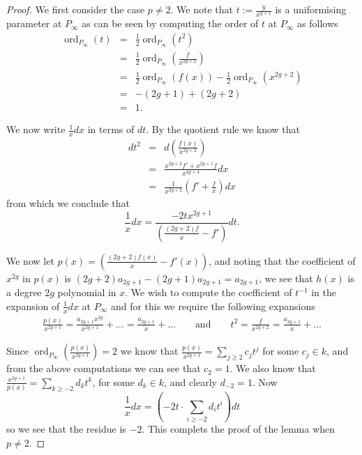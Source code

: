 \documentclass[draft, 11pt]{article} %
\theoremstyle{plain}
\theoremstyle{remark}
\DeclareMathOperator{\ord}{ord}
\begin{document}
\begin{proof}

We first consider the case $p\neq 2$.
We note that $t:= \frac{y}{x^{g+1}}$ is a uniformising parameter at $P_\infty$ as can be seen by computing the order of $t$ at $P_\infty$ as follows
\begin{eqnarray}
\ord_{P_\infty}(t) & = & \frac{1}{2}\ord_{P_\infty}(t^2) \\
  & = & \frac{1}{2}\ord_{P_\infty}\left( \frac{f}{x^{2g+2}} \right) \\
& = & \frac{1}{2}\ord_{P_\infty}(f(x)) - \frac{1}{2}\ord_{P_\infty}(x^{2g+2})\\
& = & -(2g+1) + (2g+2) \\
& = & 1.
\end{eqnarray}

We now write $\frac{1}{x}dx$ in terms of $dt$.
By the quotient rule we know that
\begin{eqnarray*}
dt^2 & = & d \left( \frac{f(x)}{x^{2g+2}} \right) \\
& = & \frac{x^{2g+2}f' + x^{2g+1}f}{x^{4g+4}} dx \\
& = & \frac{1}{x^{2g+2}} \left( f' + \frac{f}{x} \right) dx
\end{eqnarray*}
from which we conclude that
\[
\frac{1}{x}dx = \frac{-2tx^{2g+1}}{\left(\frac{(2g+2)f}{x} - f'\right)} dt.
\]


We now let $p(x) = \left(\frac{(2g+2)f(x)}{x} - f'(x)\right)$, and noting that the coefficient of $x^{2g}$ in $p(x)$ is $(2g+2)a_{2g+1} - (2g+1)a_{2g+1} = a_{2g+1}$, we see that $h(x)$ is a degree $2g$ polynomial in $x$.
We wish to compute the coefficient of $t^{-1}$ in the expansion of $\frac{1}{x}dx$ at $P_\infty$ and for this we require the following expansions
\begin{align}
\frac{p(x)}{x^{2g+1}} = \frac{a_{2g+1}x^{2g}}{x^{2g+1}} + \ldots = \frac{a_{2g+1}}{x} + \ldots \qquad \text{and} \qquad t^2 = \frac{f}{x^{2g+2} } = \frac{a_{2g+1}}{x} + \ldots
\end{align}

Since $\ord_{P_\infty}\left(\frac{p(x)}{x^{2g+1}}\right) = 2$ we know that $\frac{p(x)}{x^{2g+1}} = \sum_{j\geq 2} c_j t^j$ for some $c_j\in k$, and from the above computations we can see that $c_2 = 1$.
We also know that $\frac{x^{2g+1}}{p(x)} = \sum_{k\geq -2} d_kt^k$, for some $d_k\in k$, and clearly $d_{-2} = 1$.
Now
\[
\frac{1}{x}dx = \left( -2t \cdot \sum_{i\geq -2} d_it^i\right) dt 
\]
so we see that the residue is $-2$.
This complets the proof of the lemma when $p\neq 2$.


\end{proof}
\end{document}
